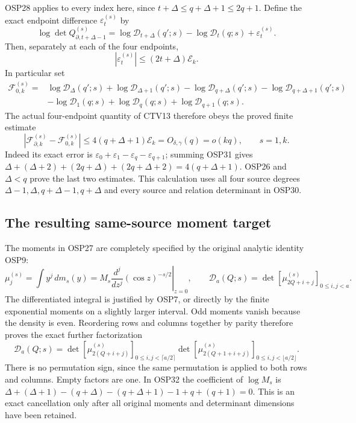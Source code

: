 \documentclass[11pt,a4paper]{article}
\begin{document}
OSP28 applies to every index here, since
$t+\Delta\le q+\Delta+1\le2q+1$. Define the exact endpoint
difference $\varepsilon_t^{(s)}$ by
\[
\log\det Q_{\partial,t+\Delta-1}^{(s)}
=\log\mathcal D_{t+\Delta}(q';s)-\log\mathcal D_t(q;s)
 +\varepsilon_t^{(s)} .
\]
Then, separately at each of the four endpoints,
\[
|\varepsilon_t^{(s)}|\le(2t+\Delta)\mathcal E_k.
\tag{OSP31}
\]
In particular set
\[
\begin{split}
\mathcal F_{0,k}^{(s)}
={}&\log\mathcal D_\Delta(q';s)
    +\log\mathcal D_{\Delta+1}(q';s)
    -\log\mathcal D_{q+\Delta}(q';s)
    -\log\mathcal D_{q+\Delta+1}(q';s)\\
 &-\log\mathcal D_1(q;s)
    +\log\mathcal D_q(q;s)+\log\mathcal D_{q+1}(q;s).
\end{split}\tag{OSP32}
\]
The actual four-endpoint quantity of CTV13 therefore obeys the
proved finite estimate
\[
\boxed{\displaystyle
\left|\mathcal F_{\partial,k}^{(s)}-\mathcal F_{0,k}^{(s)}\right|
\le4(q+\Delta+1)\mathcal E_k
=O_{\delta,\gamma}(q)=o(kq),\qquad s=1,k .}
\tag{OSP33}
\]
Indeed its exact error is
$\varepsilon_0+\varepsilon_1-\varepsilon_q-\varepsilon_{q+1}$;
summing OSP31 gives
$\Delta+(\Delta+2)+(2q+\Delta)+(2q+\Delta+2)
=4(q+\Delta+1)$. OSP26 and $\Delta<q$ prove the last two
estimates. This calculation uses all four source degrees
$\Delta-1,\Delta,q+\Delta-1,q+\Delta$ and every source and
relation determinant in OSP30.

\subsection{The resulting same-source moment target}

The moments in OSP27 are completely specified by the original
analytic identity OSP9:
\[
\mu_j^{(s)}=\int y^j\,dm_s(y)
=M_s\left.\frac{d^j}{dz^j}(\cos z)^{-s/2}\right|_{z=0},
\qquad
\mathcal D_a(Q;s)=
\det[\mu_{2Q+i+j}^{(s)}]_{0\le i,j<a}.
\tag{OSP34}
\]
The differentiated integral is justified by OSP7, or directly by
the finite exponential moments on a slightly larger interval.
Odd moments vanish because the density is even. Reordering rows
and columns together by parity therefore proves the exact further
factorization
\[
\mathcal D_a(Q;s)
=\det[\mu_{2(Q+i+j)}^{(s)}]_{0\le i,j<\lceil a/2\rceil}
 \det[\mu_{2(Q+1+i+j)}^{(s)}]_{0\le i,j<\lfloor a/2\rfloor}.
\tag{OSP35}
\]
There is no permutation sign, since the same permutation is applied
to both rows and columns. Empty factors are one.
In OSP32 the coefficient of $\log M_s$ is
$\Delta+(\Delta+1)-(q+\Delta)-(q+\Delta+1)-1+q+(q+1)=0$.
This is an exact cancellation only after all original moments
and determinant dimensions have been retained.
\end{document}
